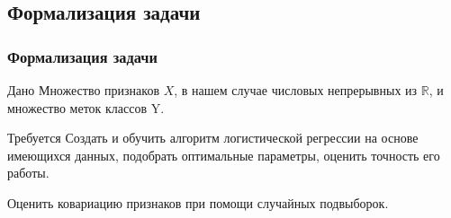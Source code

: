 \documentclass[unicode]{beamer}
\begin{document}
%

\subsection{Формализация задачи}
\begin{frame}
    \frametitle{Формализация задачи}

    \begin{block}{Дано}
        Множество признаков $X$, в нашем случае числовых непрерывных из $\mathbb{R}$, и множество меток классов Y.
    \end{block}

    \begin{block}{Требуется}
        Создать и обучить алгоритм логистической регрессии на основе имеющихся данных, подобрать оптимальные параметры, оценить точность его работы.
        
        Оценить ковариацию признаков при помощи случайных подвыборок.
    \end{block}
\end{frame}
\end{document}
